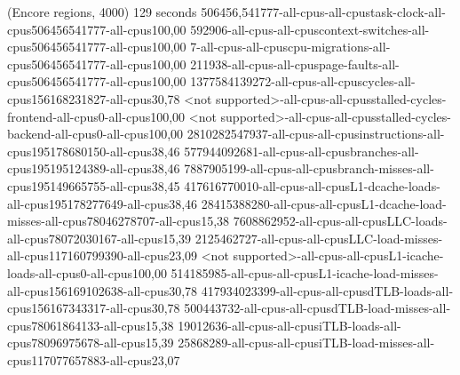 (Encore regions, 4000)
129 seconds
506456,541777-all-cpus-all-cpustask-clock-all-cpus506456541777-all-cpus100,00
592906-all-cpus-all-cpuscontext-switches-all-cpus506456541777-all-cpus100,00
7-all-cpus-all-cpuscpu-migrations-all-cpus506456541777-all-cpus100,00
211938-all-cpus-all-cpuspage-faults-all-cpus506456541777-all-cpus100,00
1377584139272-all-cpus-all-cpuscycles-all-cpus156168231827-all-cpus30,78
<not supported>-all-cpus-all-cpusstalled-cycles-frontend-all-cpus0-all-cpus100,00
<not supported>-all-cpus-all-cpusstalled-cycles-backend-all-cpus0-all-cpus100,00
2810282547937-all-cpus-all-cpusinstructions-all-cpus195178680150-all-cpus38,46
577944092681-all-cpus-all-cpusbranches-all-cpus195195124389-all-cpus38,46
7887905199-all-cpus-all-cpusbranch-misses-all-cpus195149665755-all-cpus38,45
417616770010-all-cpus-all-cpusL1-dcache-loads-all-cpus195178277649-all-cpus38,46
28415388280-all-cpus-all-cpusL1-dcache-load-misses-all-cpus78046278707-all-cpus15,38
7608862952-all-cpus-all-cpusLLC-loads-all-cpus78072030167-all-cpus15,39
2125462727-all-cpus-all-cpusLLC-load-misses-all-cpus117160799390-all-cpus23,09
<not supported>-all-cpus-all-cpusL1-icache-loads-all-cpus0-all-cpus100,00
514185985-all-cpus-all-cpusL1-icache-load-misses-all-cpus156169102638-all-cpus30,78
417934023399-all-cpus-all-cpusdTLB-loads-all-cpus156167343317-all-cpus30,78
500443732-all-cpus-all-cpusdTLB-load-misses-all-cpus78061864133-all-cpus15,38
19012636-all-cpus-all-cpusiTLB-loads-all-cpus78096975678-all-cpus15,39
25868289-all-cpus-all-cpusiTLB-load-misses-all-cpus117077657883-all-cpus23,07

